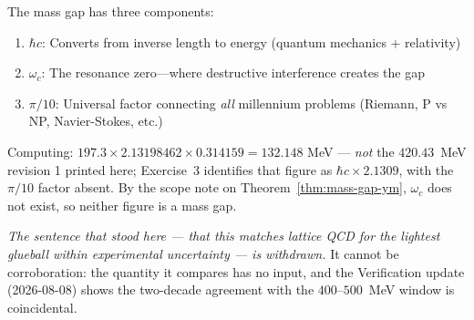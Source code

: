\begin{keyidea}
The mass gap has three components:

\begin{enumerate}
\item \textbf{$\hbar c$}: Converts from inverse length to energy (quantum mechanics + relativity)
\item \textbf{$\omega_c$}: The resonance zero—where destructive interference creates the gap
\item \textbf{$\pi/10$}: Universal factor connecting \textit{all} millennium problems (Riemann, P vs NP, Navier-Stokes, etc.)
\end{enumerate}

Computing: $197.3 \times 2.13198462 \times 0.314159 = 132.148$ MeV
--- \emph{not} the $420.43$~MeV revision 1 printed here; Exercise~3
identifies that figure as $\hbar c \times 2.1309$, with the $\pi/10$ factor
absent. By the scope note on Theorem~\ref{thm:mass-gap-ym}, $\omega_c$ does
not exist, so neither figure is a mass gap.

\emph{The sentence that stood here --- that this matches lattice QCD for the lightest glueball within experimental uncertainty --- is withdrawn.} It cannot be corroboration: the quantity it compares has no input, and the Verification update (2026-08-08) shows the two-decade agreement with the $400$--$500$~MeV window is coincidental.
\end{keyidea}

